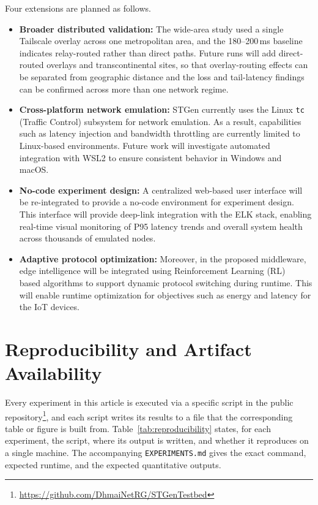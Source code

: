 \documentclass[jsan,article,submit,moreauthors,pdftex]{Definitions/mdpi}
\begin{document}
Four extensions are planned as follows.
\begin{itemize}
    \item \textbf{Broader distributed validation:}
    The wide-area study used a single Tailscale overlay across one metropolitan area, and the 180--200\,ms baseline indicates relay-routed rather than direct paths. Future runs will add direct-routed overlays and transcontinental sites, so that overlay-routing effects can be separated from geographic distance and the loss and tail-latency findings can be confirmed across more than one network regime.

    \item \textbf{Cross-platform network emulation:}
    STGen currently uses the Linux \texttt{tc} (Traffic Control) subsystem for network emulation. As a result, capabilities such as latency injection and bandwidth throttling are currently limited to Linux-based environments. Future work will investigate automated integration with WSL2 to ensure consistent behavior in Windows and macOS.

    \item \textbf{No-code experiment design:}  
    A centralized web-based user interface will be re-integrated to provide a no-code environment for experiment design. This interface will provide deep-link integration with the ELK stack, enabling real-time visual monitoring of P95 latency trends and overall system health across thousands of emulated nodes.

    \item \textbf{Adaptive protocol optimization:}
    Moreover, in the proposed middleware, edge intelligence will be integrated using Reinforcement Learning (RL)~\cite{al2015application} based algorithms to support dynamic protocol switching during runtime.  This will enable runtime optimization for objectives such as energy and latency for the IoT devices.
\end{itemize}


\section{Reproducibility and Artifact Availability}
\label{sec:reproducibility}
Every experiment in this article is executed via a specific script in the public repository\footnote{\url{https://github.com/DhmaiNetRG/STGenTestbed}}, and each script writes its results to a file that the corresponding table or figure is built from. Table~\ref{tab:reproducibility} states, for each experiment, the script, where its output is written, and whether it reproduces on a single machine. The accompanying \texttt{EXPERIMENTS.md} gives the exact command, expected runtime, and the expected quantitative outputs.
\end{document}
